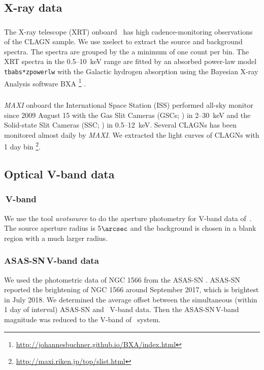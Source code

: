 \subsection{X-ray data}
\subsubsection{\xrt}
The X-ray telescope (XRT) onboard \swift\, has high cadence-monitoring observations of the CLAGN sample. We use {\sc xselect} to extract the source and background spectra. The spectra are grouped by the a minimum of one count per bin. The XRT spectra in the 0.5--10~keV range are fitted by an absorbed power-law model \texttt{tbabs*zpowerlw} with the Galactic hydrogen absorption using the Bayesian X-ray Analysis software BXA \footnote{\url{http://johannesbuchner.github.io/BXA/index.html}} \citep[][]{2014A&A...564A.125B}.


\subsubsection{\maxi}
\textit{MAXI} \citep{2009PASJ...61..999M} onboard the International Space Station (ISS) performed all-sky monitor since 2009 August 15 with the Gas Slit Cameras (GSCs; \citealt{2011PASJ...63S.623M}) 
  in 2--30~keV and the Solid-state Slit Cameras (SSC; \citealt{2011PASJ...63..397T}) in 0.5--12~keV. Several CLAGNs has been monitored almost daily by \textit{MAXI}.  We extracted the light curves of CLAGNs with 1 day bin \footnote{\url{http://maxi.riken.jp/top/slist.html}}. 

  


\subsection{Optical V-band data}
\subsubsection{\uvot\,V-band}
 We use the tool \textit{uvotsource} to do the aperture photometry for V-band data of \uvot\,. The source aperture radius is 5$\arcsec$ and the background is chosen in a blank region with a much larger radius.


\subsubsection{ASAS-SN\,V-band data}
We used the photometric data of NGC 1566 from the ASAS-SN \citep[All-sky Automated Survey for Supernovae,][]{2014ApJ...788...48S,2017PASP..129j4502K,2019MNRAS.485..961J}. ASAS-SN \citep[][]{2018ATel11893....1D} reported the brightening of NGC 1566 around September 2017, which is brightest in July 2018. We determined the average offset between the simultaneous (within 1 day of interval) ASAS-SN and \uvot\, V-band data. Then the ASAS-SN\,V-band magnitude was reduced to the V-band of \uvot\, system.



